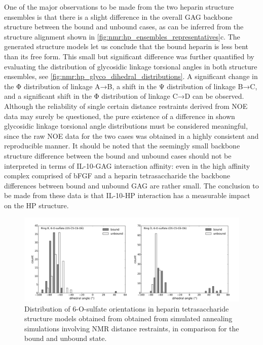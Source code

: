 One of the major observations to be made from the two heparin structure
ensembles is that there is a slight difference in the overall GAG backbone
structure between the bound and unbound cases, as can be inferred from the
structure alignment shown in \cref{fig:nmr:hp_ensembles_representatives}c. The
generated structure models let us conclude that the bound heparin is less bent
than its free form. This small but significant difference was further quantified
by evaluating the distribution of glycosidic linkage torsional angles in both
structure ensembles, see \cref{fig:nmr:hp_glyco_dihedral_distributions}. A
significant change in the Φ distribution of linkage A→B, a shift in the Ψ
distribution of linkage B→C, and a significant shift in the Φ distribution of
linkage C→D can be observed. Although the reliability of single certain distance
restraints derived from NOE data may surely be questioned, the pure existence of
a difference in shown glycosidic linkage torsional angle distributions must be
considered meaningful, since the raw NOE data for the two cases was obtained in
a highly consistent and reproducible manner. It should be noted that the
seemingly small backbone structure difference between the bound and unbound
cases should not be interpreted in terms of IL-10-GAG interaction affinity: even
in the high affinity complex comprised of bFGF and a heparin tetrasaccharide
\cite{faham_heparin_1996,mikhailov_hp_tetra_1996} the backbone differences
between bound and unbound GAG are rather small. The conclusion to be made from
these data is that IL-10-HP interaction has a measurable impact on the HP
structure.

\begin{figure}
\centering
\includegraphics[width=\textwidth]{gfx/nmr/SI_figure_6O_sulfate_dihedrals_B_D_01.png}
\caption[]{
Distribution of 6-O-sulfate orientations in heparin tetrasaccharide structure
models obtained from obtained from simulated annealing simulations involving NMR
distance restraints, in comparison for the bound and unbound state.}
\label{fig:nmr:hp_sulfate_orientations}
\end{figure}


